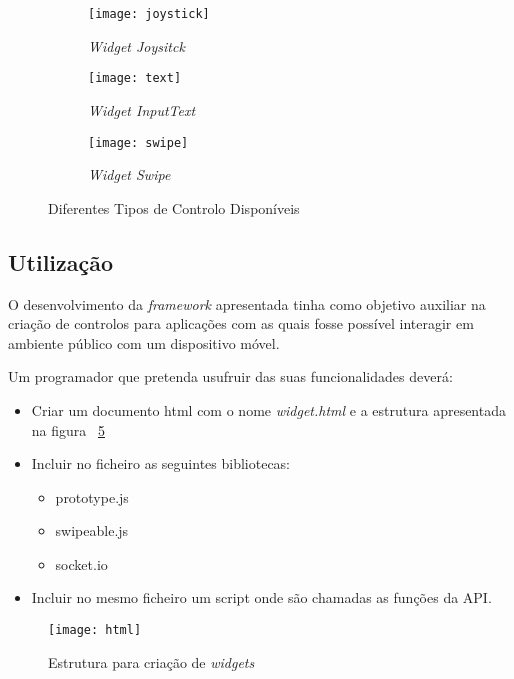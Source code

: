 	\begin{figure}[ht]
	  \centering
	  \leavevmode
	  \begin{subfigure}{.33\textwidth}
	    \centering
	    \texttt{[image: joystick]}
	    \caption{\textit{Widget Joysitck}}
	    \label{fig:joystick}
	  \end{subfigure}%
	  \begin{subfigure}{.33\textwidth}
	    \centering
	    \texttt{[image: text]}
	    \caption{\textit{Widget InputText}}
	    \label{fig:inputext}
	  \end{subfigure}%
	   \begin{subfigure}{.33\textwidth}
	    \centering
	    \texttt{[image: swipe]}
	    \caption{\textit{Widget Swipe}}
	    \label{fig:swipe}
	  \end{subfigure}
	  \caption{Diferentes Tipos de Controlo Disponíveis}
	  \label{fig:widgets}
	\end{figure}

\pagebreak

\subsection{Utilização}

	O desenvolvimento da \textit{framework} apresentada tinha como objetivo auxiliar na criação de controlos para aplicações com as quais fosse possível interagir em ambiente público com um dispositivo móvel.

	Um programador que pretenda usufruir das suas funcionalidades deverá:

	\begin{itemize}
		\item Criar um documento html com o nome \textit{widget.html} e a estrutura apresentada na figura ~\ref{fig:html_struct}
		\item Incluir no ficheiro as seguintes bibliotecas:
			\begin{itemize}
			\item prototype.js 
			\item swipeable.js
			\item socket.io
			\end{itemize}
		\item Incluir no mesmo ficheiro um script onde são chamadas as funções da API.
	\end{itemize}

	\begin{figure}[ht]
		\centering
		\texttt{[image: html]}
		\caption[Estrutura html] {Estrutura para criação de \textit{widgets}}
		\label{fig:html_struct}
	\end{figure}

